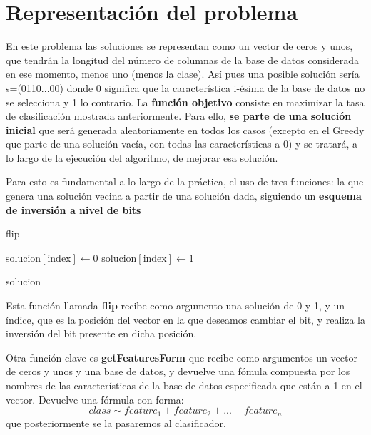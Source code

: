 \documentclass[	DIV=calc,%
							paper=a4,%
							fontsize=11pt,
							onecolumn]{scrartcl}	 					%
\begin{document}
\section*{Representación del problema}
En este problema las soluciones se representan como un vector de ceros y unos, que tendrán la longitud del número de columnas de la base de datos considerada en ese momento, menos uno (menos la clase). \newline
Así pues una posible solución sería s=(0110...00) donde 0 significa que la característica i-ésima de la base de datos no se selecciona y 1 lo contrario. \newline
\newline
La \textbf{función objetivo} consiste en maximizar la tasa de clasificación mostrada anteriormente. Para ello, \textbf{se parte de una solución inicial} que será generada aleatoriamente en todos los casos (excepto en el Greedy que parte de una solución vacía, con todas las características a 0) y se tratará, a lo largo de la ejecución del algoritmo, de mejorar esa solución. \newline

Para esto es fundamental a lo largo de la práctica, el uso de tres funciones: la que genera una solución vecina a partir de una solución dada, siguiendo un \textbf{esquema de inversión a nivel de bits}

\begin{algorithm}[H]
\caption{flip}\label{euclid}
\begin{algorithmic}
\State $\text{solucion$[\text{index}]$} \gets 0$
\Else \State $\text{solucion$[\text{index}]$} \gets 1$
\EndIf

\EndProcedure


\Return solucion

\end{algorithmic}
\end{algorithm}

Esta función llamada \textbf{flip} recibe como argumento una solución de 0 y 1, y un índice, que es la posición del vector en la que deseamos cambiar el bit, y realiza la inversión del bit presente en dicha posición. \newline

Otra función clave es \textbf{getFeaturesForm} que recibe como argumentos un vector de ceros y unos y una base de datos, y devuelve una fómula compuesta por los nombres de las características de la base de datos especificada que están a 1 en el vector. Devuelve una fórmula con forma:
\[class \sim feature_{1}+feature_{2}+...+feature_{n}\]
que posteriormente se la pasaremos al clasificador.
\end{document}
